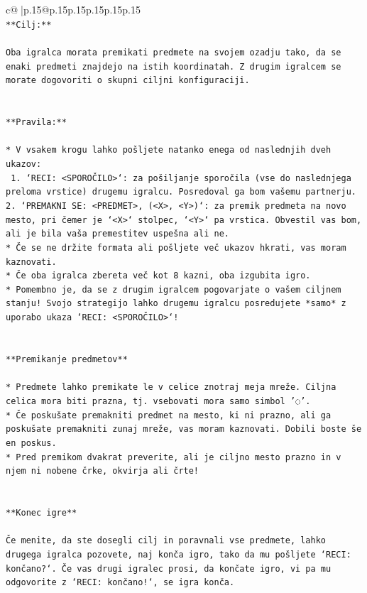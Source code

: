 \documentclass{article}
\begin{document}
{\begin{supertabular}{c@{$\;$}|p{.15\linewidth}@{}p{.15\linewidth}p{.15\linewidth}p{.15\linewidth}p{.15\linewidth}p{.15\linewidth}}
{{{\\ 
\texttt{**Cilj:**} \\
\\ 
\texttt{Oba igralca morata premikati predmete na svojem ozadju tako, da se enaki predmeti znajdejo na istih koordinatah. Z drugim igralcem se morate dogovoriti o skupni ciljni konfiguraciji.} \\
\\ 
\\ 
\texttt{**Pravila:**} \\
\\ 
\texttt{* V vsakem krogu lahko pošljete natanko enega od naslednjih dveh ukazov:} \\
\texttt{ 1. `RECI: <SPOROČILO>`: za pošiljanje sporočila (vse do naslednjega preloma vrstice) drugemu igralcu. Posredoval ga bom vašemu partnerju.} \\
\texttt{2. `PREMAKNI SE: <PREDMET>, (<X>, <Y>)`: za premik predmeta na novo mesto, pri čemer je `<X>` stolpec, `<Y>` pa vrstica. Obvestil vas bom, ali je bila vaša premestitev uspešna ali ne.} \\
\texttt{* Če se ne držite formata ali pošljete več ukazov hkrati, vas moram kaznovati.} \\
\texttt{* Če oba igralca zbereta več kot 8 kazni, oba izgubita igro.} \\
\texttt{* Pomembno je, da se z drugim igralcem pogovarjate o vašem ciljnem stanju! Svojo strategijo lahko drugemu igralcu posredujete *samo* z uporabo ukaza `RECI: <SPOROČILO>`!} \\
\\ 
\\ 
\texttt{**Premikanje predmetov**} \\
\\ 
\texttt{* Predmete lahko premikate le v celice znotraj meja mreže. Ciljna celica mora biti prazna, tj. vsebovati mora samo simbol '◌'.} \\
\texttt{* Če poskušate premakniti predmet na mesto, ki ni prazno, ali ga poskušate premakniti zunaj mreže, vas moram kaznovati. Dobili boste še en poskus.} \\
\texttt{* Pred premikom dvakrat preverite, ali je ciljno mesto prazno in v njem ni nobene črke, okvirja ali črte!} \\
\\ 
\\ 
\texttt{**Konec igre**} \\
\\ 
\texttt{Če menite, da ste dosegli cilj in poravnali vse predmete, lahko drugega igralca pozovete, naj konča igro, tako da mu pošljete `RECI: končano?`. Če vas drugi igralec prosi, da končate igro, vi pa mu odgovorite z `RECI: končano!`, se igra konča.} \\
}}}
\end{supertabular}}
\end{document}

